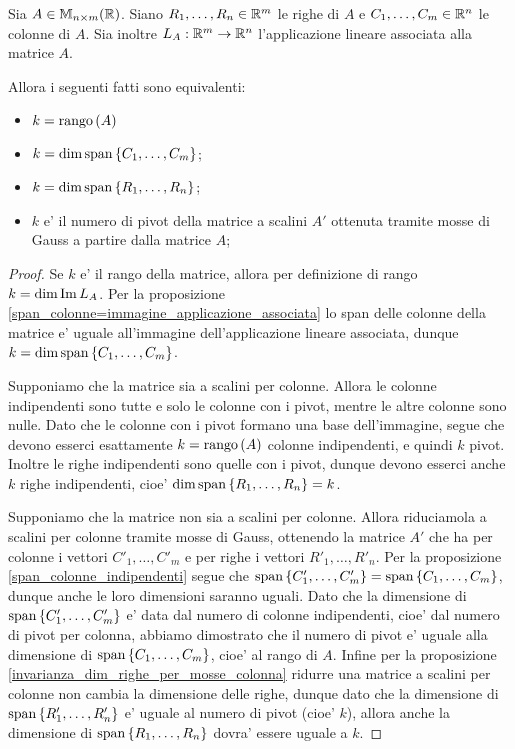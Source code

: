 \begin{proposition}
    Sia $A \in \mathbb{M}_{n \times m}(\mathbb{R})$. Siano $R_1, \dots, R_n \in \mathbb{R}^m$ le righe di $A$ e $C_1, \dots, C_m \in \mathbb{R}^n$ le colonne di $A$. Sia inoltre $L_A : \mathbb{R}^m \to \mathbb{R}^n$ l'applicazione lineare associata alla matrice $A$.
    
    Allora i seguenti fatti sono equivalenti:
    \begin{itemize}
        \item $k = \operatorname{rango}\left( A \right)$
        \item $k = \dim \operatorname{span}\left\{C_1, \dots, C_m\right\}$;
        \item $k = \dim \operatorname{span}\left\{R_1, \dots, R_n\right\}$;
        \item $k$ e' il numero di pivot della matrice a scalini $A'$ ottenuta tramite mosse di Gauss a partire dalla matrice $A$;
    \end{itemize}
\end{proposition}
\begin{proof}
    Se $k$ e' il rango della matrice, allora per definizione di rango $k = \dim \operatorname{Im}L_A$. Per la proposizione \ref{span_colonne=immagine_applicazione_associata} lo span delle colonne della matrice e' uguale all'immagine dell'applicazione lineare associata, dunque $k = \dim \operatorname{span}\left\{C_1, \dots, C_m\right\}$.

    Supponiamo che la matrice sia a scalini per colonne. Allora le colonne indipendenti sono tutte e solo le colonne con i pivot, mentre le altre colonne sono nulle. Dato che le colonne con i pivot formano una base dell'immagine, segue che devono esserci esattamente $k = \operatorname{rango}\left( A \right)$ colonne indipendenti, e quindi $k$ pivot. 
    Inoltre le righe indipendenti sono quelle con i pivot, dunque devono esserci anche $k$ righe indipendenti, cioe' $\dim \operatorname{span}\left\{R_1, \dots, R_n\right\} = k$.

    Supponiamo che la matrice non sia a scalini per colonne. Allora riduciamola a scalini per colonne tramite mosse di Gauss, ottenendo la matrice $A'$ che ha per colonne i vettori $C'_1, \dots, C'_m$ e per righe i vettori $R'_1, \dots, R'_n$.
    Per la proposizione \ref{span_colonne_indipendenti} segue che $\operatorname{span}\left\{C'_1, \dots, C'_m\right\} = \operatorname{span}\left\{C_1, \dots, C_m\right\}$, dunque anche le loro dimensioni saranno uguali. Dato che la dimensione di $\operatorname{span}\left\{C'_1, \dots, C'_m\right\}$ e' data dal numero di colonne indipendenti, cioe' dal numero di pivot per colonna, abbiamo dimostrato che il numero di pivot e' uguale alla dimensione di $\operatorname{span}\left\{C_1, \dots, C_m\right\}$, cioe' al rango di $A$. Infine per la proposizione \ref{invarianza_dim_righe_per_mosse_colonna} ridurre una matrice a scalini per colonne non cambia la dimensione delle righe, dunque dato che la dimensione di $\operatorname{span}\left\{R'_1, \dots, R'_n\right\}$ e' uguale al numero di pivot (cioe' $k$), allora anche la dimensione di $\operatorname{span}\left\{R_1, \dots, R_n\right\}$ dovra' essere uguale a $k$.
\end{proof}
